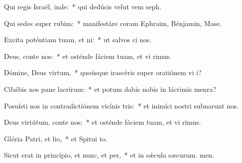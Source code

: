 \item Qui regis Israël, inde:~* qui dedúcis velut vem seph.
\item Qui sedes super rubim:~* manifestáre coram Ephraim, Bénjamin,  Mase.
\item Excita poténtiam tuam, et ni:~* ut salvos ci nos.
\item Deus, conte nos:~* et osténde fáciem tuam, et vi rimus.
\item Dómine, Deus virtum,~* quoúsque irascéris super oratiónem vi i?
\item Cibábis nos pane lacrirum:~* et potum dabis nobis in lácrimis  menra?
\item Posuísti nos in contradictiónem vicínis tris:~* et inimíci nostri subnarunt nos.
\item Deus virtútum, conte nos:~* et osténde fáciem tuam, et vi rimus.
\item Glória Patri, et lio,~* et Spitui to.
\item Sicut erat in princípio, et nunc, et per,~* et in sǽcula sæcurum. men.
